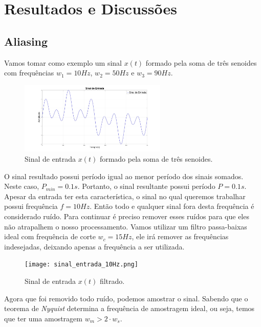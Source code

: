 \documentclass[]{IEEEtran}
\begin{document}
\section{Resultados e Discussões}

\subsection{Aliasing}

Vamos tomar como exemplo um sinal $x(t)$ formado pela soma de três senoides com frequências $w_1 = 10 Hz$, $w_2 = 50 Hz$ e $w_3 = 90 Hz$.

\begin{figure}[H]
\captionsetup{justification=centering}
\centering %
\includegraphics[width=7cm]{sinal_entrada_00.jpg} %
\caption{Sinal de entrada $x(t)$ formado pela soma de três senoides.}
\end{figure}

O sinal resultado possui período igual ao menor período dos sinais somados. Neste caso, $P_{min} = 0.1s$. Portanto, o sinal resultante possui período $P = 0.1s$. Apesar da entrada ter esta característica, o sinal no qual queremos trabalhar possui frequência $f = 10Hz$. Então todo e qualquer sinal fora desta frequência é considerado ruído. Para continuar é preciso remover esses ruídos para que eles não atrapalhem o nosso processamento. Vamos utilizar um filtro passa-baixas ideal com frequência de corte $w_c = 15Hz$, ele irá remover as frequências indesejadas, deixando apenas a frequência a ser utilizada.

\begin{figure}[H]
\captionsetup{justification=centering}
\centering %
\texttt{[image: sinal\_entrada\_10Hz.png]} %
\caption{Sinal de entrada $x(t)$ filtrado.}
\end{figure}

Agora que foi removido todo ruído, podemos amostrar o sinal. Sabendo que o teorema de \textit{Nyquist} determina a frequência de amostragem ideal, ou seja, temos que ter uma amostragem $w_{m} > 2\cdot w_{s}$.
\end{document}
